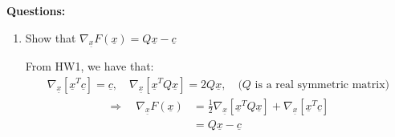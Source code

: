 \documentclass[11pt,letterpaper]{article}
\begin{document}
\begin{tcolorbox}
\begin{flushleft}
    \textbf{Questions:} 
    \begin{enumerate}
        \item Show that $\nabla_{\underline x}F(\underline x) = Q\underline x - \underline c$ 
        \begin{flushleft}
            From HW1, we have that:
            \begin{align*}
                \nabla_{\underline x} [\underline x^T \underline c] = \underline c,\quad
                \nabla_{\underline x} [\underline x^T Q \underline x] = 2Q\underline x, \quad
                \text{($Q$ is a real symmetric matrix)}
            \end{align*}
            \begin{align*}
                \Rightarrow \quad \nabla_{\underline x}F(\underline x) &= \frac{1}{2} \nabla_{\underline x} [\underline x^T Q \underline x]
                +  \nabla_{\underline x} [\underline x^T \underline c] \\
                &= Q\underline x - \underline c
            \end{align*}
        \end{flushleft}


\end{enumerate}
\end{flushleft}
\end{tcolorbox}
\end{document}
